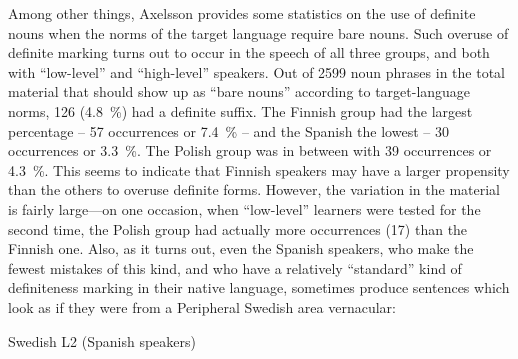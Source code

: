 \begin{styleBodytextC}
Among other things, Axelsson provides some statistics on the use of definite nouns when the norms of the target language require bare nouns. Such overuse of definite marking turns out to occur in the speech of all three groups, and both with “low-level” and “high-level” speakers. Out of 2599 noun phrases in the total material that should show up as “bare nouns” according to target-language norms, 126 (4.8~\%) had a definite suffix. The Finnish group had the largest percentage – 57 occurrences or 7.4~\% – and the Spanish the lowest – 30 occurrences or 3.3~\%. The Polish group was in between with 39 occurrences or 4.3~\%. This seems to indicate that Finnish speakers may have a larger propensity than the others to overuse definite forms. However, the variation in the material is fairly large—on one occasion, when “low-level” learners were tested for the second time, the Polish group had actually more occurrences (17) than the Finnish one. Also, as it turns out, even the Spanish speakers, who make the fewest mistakes of this kind, and who have a relatively “standard” kind of definiteness marking in their native language, sometimes produce sentences which look as if they were from a Peripheral Swedish area vernacular:

\end{styleBodytextC}

\begin{listWWNumileveli}
\item {}

\begin{styleExample}
Swedish L2 (Spanish speakers)

\end{styleExample}

\end{listWWNumileveli}

\begin{listWWNumlvleveli}
\item {}

\end{listWWNumlvleveli}

